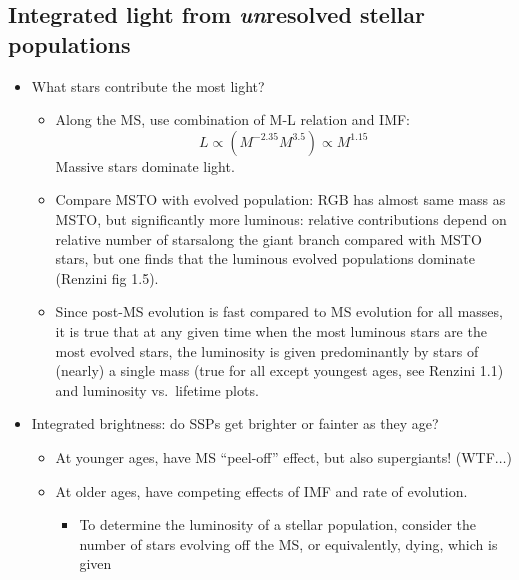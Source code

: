 \documentclass{article}
\begin{document}
\subsection{Integrated light from \emph{un}resolved stellar populations}
      \begin{itemize}
        \item What stars contribute the most light?
            \begin{itemize}
                \item Along the MS, use combination of M-L relation and IMF:
                    $$ L \propto (M^{-2.35}M^{3.5}) \propto M^{1.15} $$
                    Massive stars dominate light.
                \item Compare MSTO with evolved population: RGB has almost
                    same mass as MSTO, but significantly more luminous: relative
                    contributions depend on relative number of starsalong the
                    giant branch compared with MSTO stars, but one finds that
                    the luminous evolved populations dominate (Renzini fig 1.5).
                \item Since post-MS evolution is fast compared to MS evolution
                    for all masses, it is true that at any given time when the
                    most luminous stars are the most evolved stars, the luminosity
                    is given predominantly by stars of (nearly) a single mass
                    (true for all except youngest ages, see Renzini 1.1) and
                    luminosity vs.\ lifetime plots.
            \end{itemize}
        \item Integrated brightness: do SSPs get brighter or fainter as they age?
            \begin{itemize}
                \item At younger ages, have MS ``peel-off'' effect, but also
                    supergiants! (WTF$\ldots$)
                \item At older ages, have competing effects of IMF and rate of
                    evolution.
                    \begin{itemize}
                        \item To determine the luminosity of a stellar
                            population, consider the number of stars evolving
                            off the MS, or equivalently, dying, which is given

\end{itemize}
\end{itemize}
\end{itemize}
\end{document}
